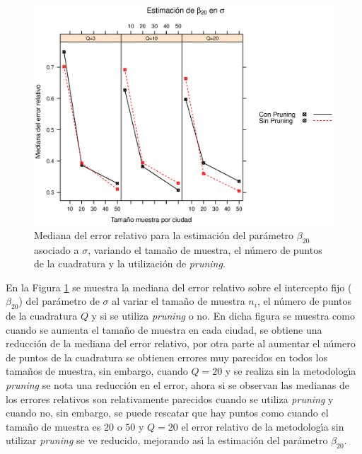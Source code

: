 \begin{figure}
	\begin{center}
		\includegraphics[scale=0.6]{MAPE_beta0_sigma.eps}	
		\caption{Mediana del error relativo para la estimaci\'{o}n del par\'{a}metro $\beta_{20}$ asociado a $\sigma$, variando el tama\~{n}o de muestra, el n\'{u}mero de puntos de la cuadratura y  la utilizaci\'{o}n de \textit{pruning}.}
		\label{MAPE_beta0_sigma}
	\end{center}
\end{figure}

En la Figura \ref{MAPE_beta0_sigma} se muestra la mediana del error relativo sobre el intercepto fijo ($\beta_{20}$) del par\'{a}metro de $\sigma$ al variar el tama\~{n}o de muestra $n_i$, el n\'{u}mero de puntos de la cuadratura $Q$ y si se utiliza \textit{pruning} o no. En dicha figura se muestra como cuando se aumenta el tama\~{n}o de muestra en cada ciudad, se obtiene una reducci\'{o}n de la mediana del error relativo, por otra parte al aumentar el n\'{u}mero de puntos de la cuadratura se obtienen errores muy parecidos en todos los tama\~{n}os de muestra, sin embargo, cuando $Q=20$ y se realiza sin la metodolog\'{\i}a \textit{pruning} se nota una reducci\'{o}n en el error, ahora si se observan las medianas de los errores relativos son relativamente parecidos cuando se utiliza \textit{pruning} y cuando no, sin embargo, se puede rescatar que hay puntos como cuando el tama\~{n}o de muestra es $20$ o $50$ y $Q=20$ el error relativo de la metodolog\'{\i}a sin utilizar \textit{pruning} se ve reducido, mejorando as\'{\i} la estimaci\'{o}n del par\'{a}metro $\beta_{20}$.\\



